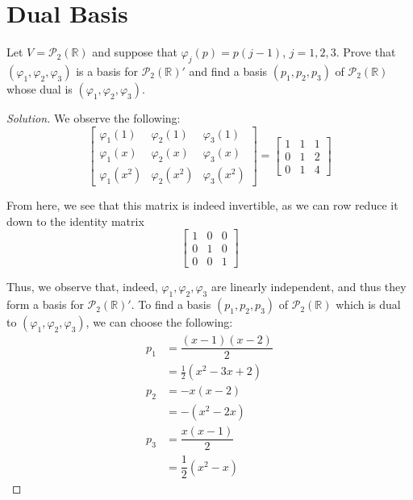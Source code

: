 \documentclass{article}
\newenvironment{solution}{\begin{proof}[Solution]}{\end{proof}}
\newcommand{\RR}{\mathbb{R}}
\begin{document}
	\newpage
	
	\section{Dual Basis}
	\begin{hw}
		Let $V = \mathscr{P}_{2}(\RR)$ and suppose that $\varphi_{j}(p) = p(j-1)$, $j = 1,2,3$. Prove that $(\varphi_1,\varphi_2,\varphi_3)$ is a basis for $\mathscr{P}_{2}(\RR)'$ and find a basis $(p_{1}, p_{2}, p_{3})$ of $\mathscr{P}_{2}(\RR)$ whose dual is $(\varphi_1,\varphi_2,\varphi_3)$.
	\end{hw}
	\begin{solution}
		We observe the following:
		\begin{equation*}
			\begin{bmatrix}
				\varphi_1(1) & \varphi_2(1) & \varphi_3(1) \\
				\varphi_{1}(x) & \varphi_2(x) &\varphi_3(x) \\
				\varphi_1(x^{2}) & \varphi_{2}(x^{2}) &\varphi_3(x^{2})
			\end{bmatrix}
			=
			\begin{bmatrix}
				1 & 1 & 1 \\
				0 & 1 & 2 \\
				0 & 1 & 4
			\end{bmatrix}
		\end{equation*}
	
		From here, we see that this matrix is indeed invertible, as we can row reduce it down to the identity matrix
		\begin{equation*}
			\begin{bmatrix}
				1 & 0 & 0 \\ 0 & 1 & 0 \\ 0 & 0 & 1
			\end{bmatrix}
		\end{equation*}
	
		Thus, we observe that, indeed, $\varphi_1, \varphi_2, \varphi_3$ are linearly independent, and thus they form a basis for $\mathscr{P}_{2}(\RR)'$. To find a basis $(p_{1}, p_{2}, p_{3})$ of $\mathscr{P}_{2}(\RR)$ which is dual to $(\varphi_1, \varphi_2, \varphi_3)$, we can choose the following:
		\begin{align*}
			p_{1} &= \dfrac{(x-1)(x-2)}{2} \\
			&= \frac{1}{2}(x^{2} - 3x + 2) \\
			p_{2} &= -x(x-2) \\
			&= -(x^{2} - 2x) \\
			p_{3} &= \dfrac{x(x-1)}{2} \\
			&= \dfrac{1}{2}(x^{2} - x)
		\end{align*}
	

\end{solution}
\end{document}
